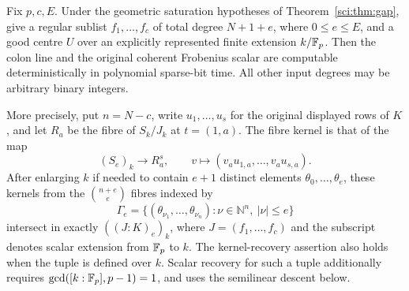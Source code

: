\begin{proposition}
\label{sci:prop:fibre-grid}
Fix \(p,c,E\). Under the geometric saturation hypotheses of
Theorem~\ref{sci:thm:gap}, give a
regular sublist \(f_1,\ldots,f_c\) of total degree \(N+1+e\),
where \(0\leq e\leq E\), and a good centre \(U\) over an explicitly
represented finite extension \(k/\mathbb F_p\). Then the colon line and
the original coherent Frobenius scalar are computable deterministically
in polynomial sparse-bit time. All other input degrees may be arbitrary
binary integers.

More precisely, put \(n=N-c\), write \(u_1,\ldots,u_s\) for the
original displayed rows of \(K\), and let \(R_a\) be the fibre of
\(S_k/J_k\) at \(t=(1,a)\). The fibre kernel is that of the map
\[
 (S_e)_k\longrightarrow R_a^s,\qquad
 v\longmapsto(v_a u_{1,a},\ldots,v_a u_{s,a}).
\]
After enlarging \(k\) if needed to contain \(e+1\)
distinct elements \(\theta_0,\ldots,\theta_e\), these kernels from the
\(\binom{n+e}{e}\) fibres indexed by
\[
 \Gamma_e=\{(\theta_{\nu_1},\ldots,\theta_{\nu_n}):
          \nu\in\mathbb N^n,\ |\nu|\leq e\}
\]
intersect in exactly \(((J:K)_e)_k\), where \(J=(f_1,\ldots,f_c)\)
and the subscript denotes scalar extension from \(\mathbb F_p\) to \(k\).
The kernel-recovery assertion also holds when the tuple is defined
over \(k\). Scalar recovery for such a tuple additionally requires
\(\gcd([k:\mathbb F_p],p-1)=1\), and uses the semilinear descent below.
\end{proposition}
